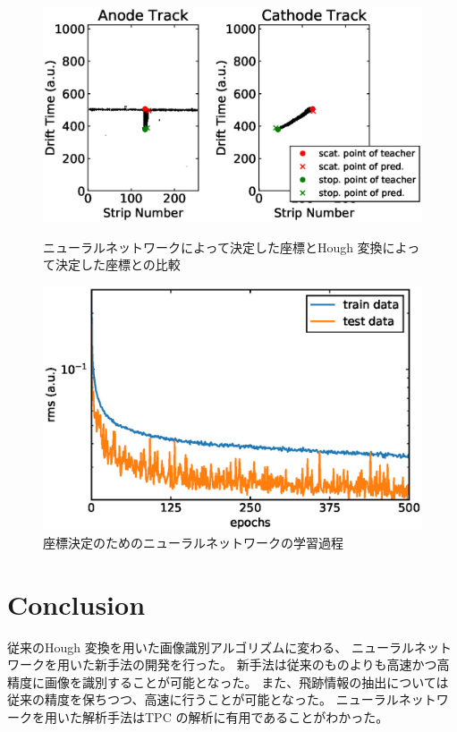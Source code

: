 \documentclass{jps-cp}
\begin{document}
\begin{figure}
  \centering
  \begin{minipage}{0.4\columnwidth}
    \centering
    \includegraphics[clip,width=\columnwidth]{eps/point_detection_compair.eps}
    \caption{ニューラルネットワークによって決定した座標とHough 変換によって決定した座標との比較}
    \label{fig:result_detection}
  \end{minipage}
  \begin{minipage}{0.4\columnwidth}
    \centering
    \includegraphics[clip,width=\columnwidth]{eps/point_detection_history.eps}
    \caption{座標決定のためのニューラルネットワークの学習過程}
    \label{fig:history_detection}
  \end{minipage}
\end{figure}

\section{Conclusion}
従来のHough 変換を用いた画像識別アルゴリズムに変わる、
ニューラルネットワークを用いた新手法の開発を行った。
新手法は従来のものよりも高速かつ高精度に画像を識別することが可能となった。
また、飛跡情報の抽出については従来の精度を保ちつつ、高速に行うことが可能となった。
ニューラルネットワークを用いた解析手法はTPC の解析に有用であることがわかった。
\end{document}
